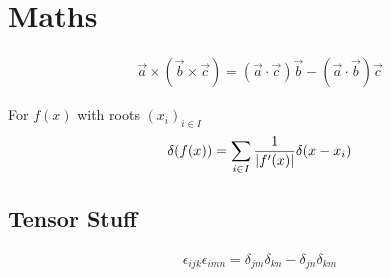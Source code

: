 \section{Maths}

\begin{align*}
  \vec{a} \times (\vec{b} \times \vec{c}) = (\vec{a} \cdot \vec{c}) \vec{b} - (\vec{a} \cdot \vec{b}) \vec{c}
\end{align*}

For $f(x)$ with roots $(x_i)_{i \in I}$
\begin{align*}
  \delta(f(x)) = \sum_{i \in I} \frac{1}{\vert f'(x)\vert}\delta(x - x_i)
\end{align*}


\subsection{Tensor Stuff}

\begin{align*}
  \epsilon_{ijk} \epsilon_{imn} = \delta_{jm} \delta_{kn} - \delta_{jn} \delta_{km}
\end{align*}



